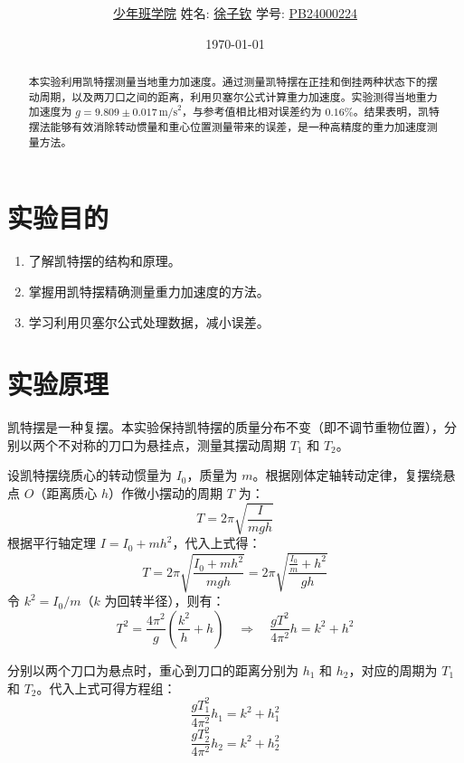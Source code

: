 \documentclass[12pt,a4paper]{article}
\title{\Huge{\textbf{\uuline{凯\ 特\ 摆\ 实\ 验\ 报\ 告}}}}
\author{\uline{少年班学院} \quad 姓名: \uline{徐子钦} \quad 学号: \uline{PB24000224}}
\date{\today}
\begin{document}
\maketitle

\begin{abstract}
本实验利用凯特摆测量当地重力加速度。通过测量凯特摆在正挂和倒挂两种状态下的摆动周期，以及两刀口之间的距离，利用贝塞尔公式计算重力加速度。实验测得当地重力加速度为 $g = 9.809 \pm 0.017 \,\text{m/s}^2$，与参考值相比相对误差约为 $0.16\%$。结果表明，凯特摆法能够有效消除转动惯量和重心位置测量带来的误差，是一种高精度的重力加速度测量方法。
\end{abstract}

\section{实验目的}
\begin{enumerate}
    \item 了解凯特摆的结构和原理。
    \item 掌握用凯特摆精确测量重力加速度的方法。
    \item 学习利用贝塞尔公式处理数据，减小误差。
\end{enumerate}

\section{实验原理}
凯特摆是一种复摆。本实验保持凯特摆的质量分布不变（即不调节重物位置），分别以两个不对称的刀口为悬挂点，测量其摆动周期 $T_1$ 和 $T_2$。

设凯特摆绕质心的转动惯量为 $I_0$，质量为 $m$。根据刚体定轴转动定律，复摆绕悬点 $O$（距离质心 $h$）作微小摆动的周期 $T$ 为：
\[ T = 2\pi \sqrt{\frac{I}{mgh}} \]
根据平行轴定理 $I = I_0 + mh^2$，代入上式得：
\[ T = 2\pi \sqrt{\frac{I_0 + mh^2}{mgh}} = 2\pi \sqrt{\frac{\frac{I_0}{m} + h^2}{gh}} \]
令 $k^2 = I_0/m$（$k$ 为回转半径），则有：
\[ T^2 = \frac{4\pi^2}{g} \left( \frac{k^2}{h} + h \right) \quad \Rightarrow \quad \frac{gT^2}{4\pi^2} h = k^2 + h^2 \]

分别以两个刀口为悬点时，重心到刀口的距离分别为 $h_1$ 和 $h_2$，对应的周期为 $T_1$ 和 $T_2$。代入上式可得方程组：
\begin{equation}
    \frac{gT_1^2}{4\pi^2} h_1 = k^2 + h_1^2 
\end{equation}
\begin{equation}
    \frac{gT_2^2}{4\pi^2} h_2 = k^2 + h_2^2
\end{equation}
\end{document}
